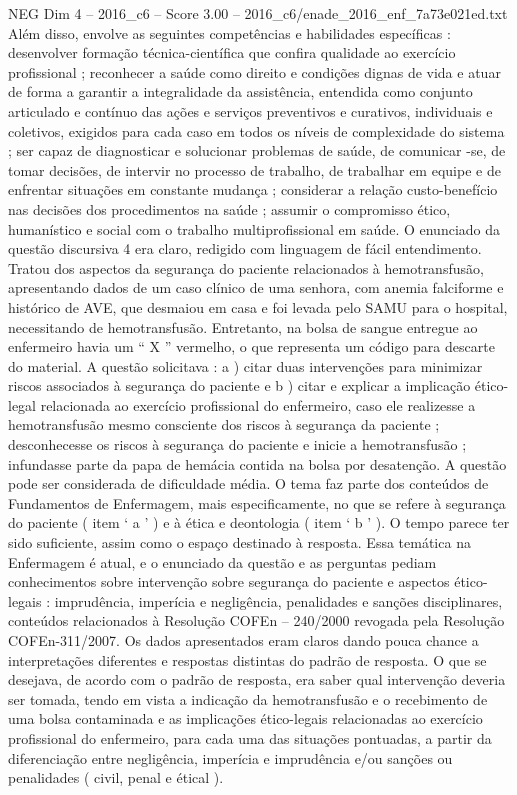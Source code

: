 \begin{textsample}{NEG Dim 4 – 2016\_c6 – Score 3.00 – 2016\_c6/enade\_2016\_enf\_7a73e021ed.txt}
Além disso, envolve as seguintes competências e habilidades específicas : desenvolver formação técnica-científica que confira qualidade ao exercício profissional ; reconhecer a saúde como direito e condições dignas de vida e atuar de forma a garantir a integralidade da assistência, entendida como conjunto articulado e contínuo das ações e serviços preventivos e curativos, individuais e coletivos, exigidos para cada caso em todos os níveis de complexidade do sistema ; ser capaz de diagnosticar e solucionar problemas de saúde, de comunicar -se, de tomar decisões, de intervir no processo de trabalho, de trabalhar em equipe e de enfrentar situações em constante mudança ; considerar a relação custo-benefício nas decisões dos procedimentos na saúde ; assumir o compromisso ético, humanístico e social com o trabalho multiprofissional em saúde.
O enunciado da questão discursiva 4 era claro, redigido com linguagem de fácil entendimento.
Tratou dos aspectos da segurança do paciente relacionados à hemotransfusão, apresentando dados de um caso clínico de uma senhora, com anemia falciforme e histórico de AVE, que desmaiou em casa e foi levada pelo SAMU para o hospital, necessitando de hemotransfusão.
Entretanto, na bolsa de sangue entregue ao enfermeiro havia um “ X ” vermelho, o que representa um código para descarte do material.
A questão solicitava : a ) citar duas intervenções para minimizar riscos associados à segurança do paciente e b ) citar e explicar a implicação ético-legal relacionada ao exercício profissional do enfermeiro, caso ele realizesse a hemotransfusão mesmo consciente dos riscos à segurança da paciente ; desconhecesse os riscos à segurança do paciente e inicie a hemotransfusão ; infundasse parte da papa de hemácia contida na bolsa por desatenção.
A questão pode ser considerada de dificuldade média.
O tema faz parte dos conteúdos de Fundamentos de Enfermagem, mais especificamente, no que se refere à segurança do paciente ( item ‘ a ’ ) e à ética e deontologia ( item ‘ b ’ ).
O tempo parece ter sido suficiente, assim como o espaço destinado à resposta.
Essa temática na Enfermagem é atual, e o enunciado da questão e as perguntas pediam conhecimentos sobre intervenção sobre segurança do paciente e aspectos ético-legais : imprudência, imperícia e negligência, penalidades e sanções disciplinares, conteúdos relacionados à Resolução COFEn – 240/2000 revogada pela Resolução COFEn-311/2007.
Os dados apresentados eram claros dando pouca chance a interpretações diferentes e respostas distintas do padrão de resposta.
O que se desejava, de acordo com o padrão de resposta, era saber qual intervenção deveria ser tomada, tendo em vista a indicação da hemotransfusão e o recebimento de uma bolsa contaminada e as implicações ético-legais relacionadas ao exercício profissional do enfermeiro, para cada uma das situações pontuadas, a partir da diferenciação entre negligência, imperícia e imprudência e/ou sanções ou penalidades ( civil, penal e étical ).

\end{textsample}

